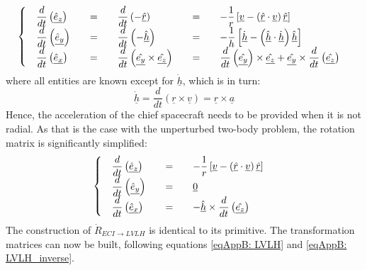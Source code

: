 			\[
			\arraycolsep=10pt
			\def\arraystretch{1.3}
			\left\{ \begin{array}{lllll}
			\dfrac{d}{dt} \left(\underline{\hat{e}_z}\right) & = & \dfrac{d}{dt} \left(-\underline{\hat{r}}\right) & = & - \dfrac{1}{r} \left[ \underline{v} - \left(\underline{\hat{r}} \cdot \underline{v}\right)\underline{\hat{r}}\right] \\
			\dfrac{d}{dt} \left(\underline{\hat{e}_y}\right) & = & \dfrac{d}{dt} \left(-\underline{\hat{h}}\right) & = & - \dfrac{1}{h} \left[ \underline{\dot{h}} - \left(\underline{\hat{h}} \cdot \underline{\dot{h}}\right)\underline{\hat{h}}\right] \\
			\dfrac{d}{dt} \left(\underline{\hat{e}_x}\right)  & = & \dfrac{d}{dt} \left(\underline{\hat{e_y}}\times \underline{\hat{e_z}}\right) & = & \dfrac{d}{dt} \left(\underline{\hat{e_y}}\right)\times\underline{\hat{e_z}} +  \underline{\hat{e_y}}\times \dfrac{d}{dt} \left(\underline{\hat{e_z}}\right)
			\end{array} \right.
			\]
			\noindent where all entities are known except for $\underline{\dot{h}}$, which is in turn:
			\[
			\underline{\dot{h}} = \dfrac{d}{dt} \left(\underline{r}\times \underline{v}\right) = \underline{r} \times \underline{a}
			\]
			\indent Hence, the acceleration of the chief spacecraft needs to be provided when it is not radial. As that is the case with the unperturbed two-body problem, the rotation matrix is significantly simplified:
			\[
			\arraycolsep=10pt
			\def\arraystretch{1.3}
			\left\{ \begin{array}{lllll}
			\dfrac{d}{dt} \left(\underline{\hat{e}_z}\right) 	& = & - \dfrac{1}{r} \left[ \underline{v} - \left(\underline{\hat{r}} \cdot \underline{v}\right)\underline{\hat{r}}\right] \\
			\dfrac{d}{dt} \left(\underline{\hat{e}_y}\right) 	& = & 	\underline{0} \\
			\dfrac{d}{dt} \left(\underline{\hat{e}_x}\right) 	& = & - \underline{\hat{h}} \times \dfrac{d}{dt} \left(\underline{\hat{e_z}}\right) 
			\end{array} \right.
			\]
			\indent The construction of $\dot{R}_{ECI\to LVLH}$	is identical to its primitive. The transformation matrices can now be built, following equations \ref{eqAppB: 	LVLH} and \ref{eqAppB: 	LVLH_inverse}.
			
